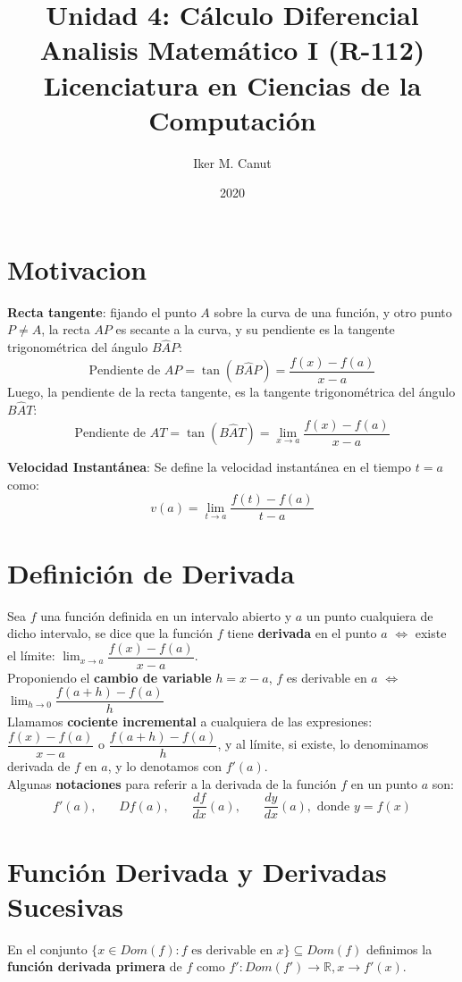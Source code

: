 \documentclass[11pt,a4paper]{article}
\author{Iker M. Canut}
\title{Unidad 4: C\'alculo Diferencial\\ Analisis Matem\'atico I (R-112)\\Licenciatura en Ciencias de la Computaci\'on}
\date{2020}
\begin{document}
\maketitle
\newpage

\section{Motivacion}
\textbf{Recta tangente}: fijando el punto $A$ sobre la curva de una funci\'on, y otro punto $P\not=A$, la recta $AP$ es secante a la curva, y su pendiente es la tangente trigonom\'etrica del \'angulo $B\hat{A}P$:
$$\text{Pendiente de $AP$} = \tan(B\hat{A}P) = \dfrac{f(x)-f(a)}{x-a}$$
\noindent Luego, la pendiente de la recta tangente, es la tangente trigonom\'etrica del \'angulo $B\hat{A}T$:
$$\text{Pendiente de $AT$} = \tan(B\hat{A}T) = \displaystyle{\lim_{x \to a} \dfrac{f(x)-f(a)}{x-a}}$$

\noindent \textbf{Velocidad Instant\'anea}: Se define la velocidad instant\'anea en el tiempo $t=a$ como:
$$v(a) = \displaystyle{\lim_{t \to a} \dfrac{f(t)-f(a)}{t-a}}$$

\section{Definici\'on de Derivada}
\noindent Sea $f$ una funci\'on definida en un intervalo abierto y $a$ un punto cualquiera de dicho intervalo, se dice que la funci\'on $f$ tiene \textbf{derivada} en el punto $a$ $\iff$ existe el l\'imite: $\displaystyle{\lim_{x \to a} \dfrac{f(x)-f(a)}{x-a}}$.\\
\noindent Proponiendo el \textbf{cambio de variable} $h=x-a$, $f$ es derivable en $a$ $\iff$ $\displaystyle{\lim_{h \to 0} \dfrac{f(a+h)-f(a)}{h}}$\\

\noindent Llamamos \textbf{cociente incremental} a cualquiera de las expresiones: $\dfrac{f(x)-f(a)}{x-a}$ o $\dfrac{f(a+h)-f(a)}{h}$, y al l\'imite, si existe, lo denominamos derivada de $f$ en $a$, y lo denotamos con $f'(a)$.\\

\noindent Algunas \textbf{notaciones} para referir a la derivada de la funci\'on $f$ en un punto $a$ son:
$$f'(a),\ \ \ \ \ \ \ \ Df(a),\ \ \ \ \ \ \ \ \dfrac{df}{dx}(a),\ \ \ \ \ \ \ \ \dfrac{dy}{dx}(a), \text{ donde $y=f(x)$}$$

\section{Funci\'on Derivada y Derivadas Sucesivas}
\noindent En el conjunto $\{x \in Dom(f) : f \text{ es derivable en $x$}\} \subseteq Dom(f)$ definimos la \textbf{funci\'on derivada primera} de $f$ como $f' : Dom(f') \rightarrow \mathbb{R}, x\rightarrow f'(x)$.\\
\end{document}
